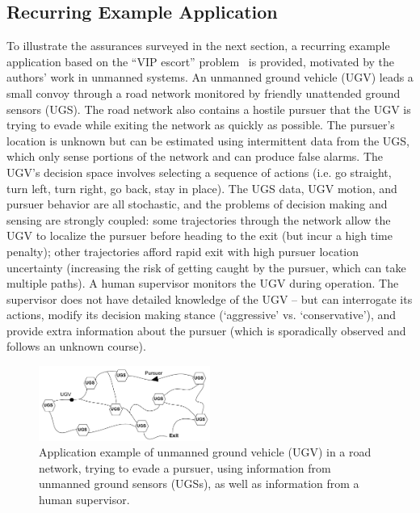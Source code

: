 \subsection{Recurring Example Application} \label{sec:mot_example}
    To illustrate the assurances surveyed in the next section, a recurring example application based on the ``VIP escort'' problem~\cite{Humphrey2012-lr} is provided, motivated by the authors' work in unmanned systems. 
    An unmanned ground vehicle (UGV) leads a small convoy through a road network monitored by friendly unattended ground sensors (UGS). The road network also contains a hostile pursuer that the UGV is trying to evade while exiting the network as quickly as possible. 
    The pursuer's location is unknown but can be estimated using intermittent data from the UGS, which only sense portions of the network and can produce false alarms. The UGV's decision space involves selecting a sequence of actions (i.e. go straight, turn left, turn right, go back, stay in place). The UGS data, UGV motion, and pursuer behavior are all stochastic, and the problems of decision making and sensing are strongly coupled: some trajectories through the network allow the UGV to localize the pursuer before heading to the exit (but incur a high time penalty); other trajectories afford rapid exit with high pursuer location uncertainty (increasing the risk of getting caught by the pursuer, which can take multiple paths). 
    A human supervisor monitors the UGV during operation. 
    The supervisor does not have detailed knowledge of the UGV -- but can interrogate its actions, modify its decision making stance (`aggressive' vs. `conservative'), and provide extra information about the pursuer (which is sporadically observed and follows an unknown course). 
    
	\begin{figure}[t]%
    	\centering
     	\includegraphics[width=0.5\textwidth]{Figures/RoadNet}
    	\caption{Application example of unmanned ground vehicle (UGV) in a road network, trying to evade a pursuer, using information from unmanned ground sensors (UGSs), as well as information from a human supervisor.} 
        \label{fig:RoadNet}
    \end{figure}

